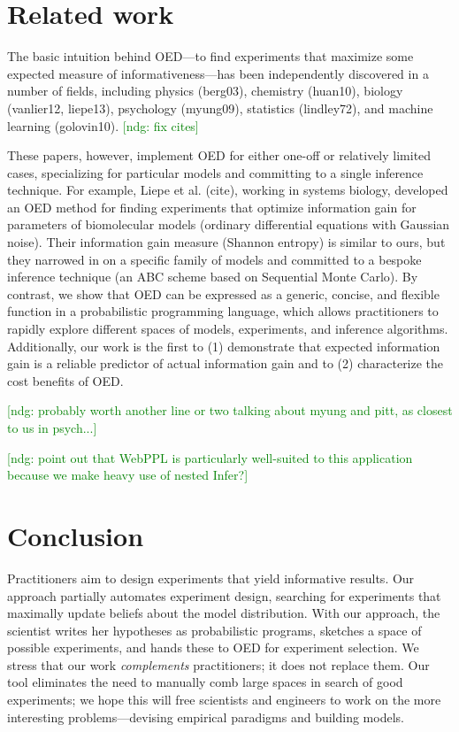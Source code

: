 \documentclass{article}
\newcommand{\ndg}[1]{\textcolor{Green}{[ndg: #1]}}
\begin{document}

\section{Related work}

The basic intuition behind OED---to find experiments that maximize some expected measure of informativeness---has been independently discovered in a number of fields, including physics (berg03), chemistry (huan10), biology (vanlier12, liepe13), psychology (myung09), statistics (lindley72), and machine learning (golovin10). \ndg{fix cites}

These papers, however, implement OED for either one-off or relatively limited cases, specializing for  particular models and committing to a single inference technique.
For example, Liepe et al. (cite), working in systems biology, developed an OED method for finding experiments that optimize information gain for parameters of biomolecular models (ordinary differential equations with Gaussian noise).
Their information gain measure (Shannon entropy) is similar to ours, but they narrowed in on a specific family of models and committed to a bespoke inference technique (an ABC scheme based on Sequential Monte Carlo).
By contrast, we show that OED can be expressed as a generic, concise, and flexible function in a probabilistic programming language, which allows practitioners to rapidly explore different spaces of models, experiments, and inference algorithms.
Additionally, our work is the first to (1) demonstrate that expected information gain is a reliable predictor of actual information gain and to (2) characterize the cost benefits of OED.

\ndg{probably worth another line or two talking about myung and pitt, as closest to us in psych...}

\ndg{point out that WebPPL is particularly well-suited to this application because we make heavy use of nested Infer?}

\section{Conclusion}

Practitioners aim to design experiments that yield informative results.
Our approach partially automates experiment design, searching for experiments that maximally update beliefs about the model distribution.
With our approach, the scientist writes her hypotheses as probabilistic programs, sketches a space of possible experiments, and hands these to OED for experiment selection.
We stress that our work \emph{complements} practitioners; it does not replace them.
Our tool eliminates the need to manually comb large spaces in search of good experiments; we hope this will free scientists and engineers to work on the more interesting problems---devising empirical paradigms and building models.
\end{document}
